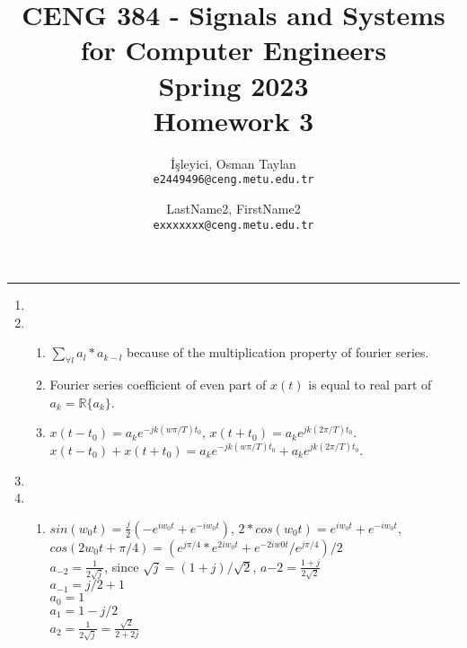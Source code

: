 \documentclass[10pt,a4paper, margin=1in]{article}
\author{
  İşleyici, Osman Taylan\\
  \texttt{e2449496@ceng.metu.edu.tr}
  \and
  LastName2, FirstName2\\
  \texttt{exxxxxxx@ceng.metu.edu.tr}
}
\title{CENG 384 - Signals and Systems for Computer Engineers \\
Spring 2023 \\
Homework 3}
\begin{document}
\maketitle



\noindent\rule{19cm}{1.2pt}

\begin{enumerate}

\item %

\item %
	\begin{enumerate}
    \item $\sum\limits_{\forall l}a_l*a_{k-l}$ because of the multiplication property of fourier series.
    \item Fourier series coefficient of even part of $x(t)$ is equal to real part of $a_k = \mathbb{R} \{a_k\}$.
	\item $x(t-t_0) = a_ke^{-jk(w\pi/T)t_0}$, $x(t+t_0) = a_ke^{jk(2\pi/T)t_0}$. $x(t-t_0) + x(t+t_0) = a_ke^{-jk(w\pi/T)t_0} + a_ke^{jk(2\pi/T)t_0}$.
    \end{enumerate}

\item %

\item %
    \begin{enumerate}   
    \item $sin(w_0t) = \frac{j}{2}(-e^{iw_0t} + e^{-iw_0t})$, $2*cos(w_0t) = e^{iw_0t} + e^{-iw_0t}$, $cos(2w_0t + \pi/4) = (e^{j\pi/4}*e^{2iw_0t} + e^{-2iw0t}/e^{j\pi/4})/2$ \\
    $a_{-2} = \frac{1}{2\sqrt{j}}$, since $\sqrt{j} = (1+j)/\sqrt{2}$, $a{-2} = \frac{1+j}{2\sqrt{2}}$\\
    $a_{-1} = j/2+1$\\
    $a_0 = 1$\\
    $a_1 = 1-j/2$\\
    $a_2 = \frac{1}{2\sqrt{j}} = \frac{\sqrt{2}}{2+2j}$\\



\end{enumerate}
\end{enumerate}
\end{document}
